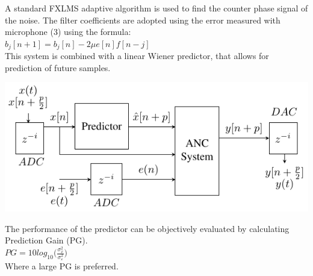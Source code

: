 A standard FXLMS adaptive algorithm is used to find the counter phase signal of the noise. The filter coefficients are adopted using the error measured with microphone (3) using the formula:
\\ $b_j[n+1] = b_j[n] - 2\mu e[n]f[n-j]$\\
This system is combined with a linear Wiener predictor, that allows for prediction of future samples.    
\begin{centering}
	\includegraphics[width=\textwidth]{figures/CombinedSystem2.pdf}
\end{centering}
The performance of the predictor can be objectively evaluated by calculating Prediction Gain (PG). \\
$PG = 10 log_{10}\bigg(\frac{\sigma^2_x}{\sigma^2_\varepsilon}\bigg)$\\
Where a large PG is preferred. 
